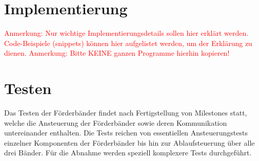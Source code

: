 \documentclass[a4paper, 11pt]{article}
\begin{document}
\newpage

\label{sec:hsm3}

\newpage
\section{Implementierung}
\textcolor{red}{Anmerkung: Nur wichtige Implementierungsdetails sollen hier erklärt werden. Code-Beispiele (snippets) können hier aufgelistet werden, um der Erklärung zu dienen. 
Anmerkung: Bitte KEINE ganzen Programme hierhin kopieren!
}

\section{Testen}
Das Testen der Förderbänder findet nach Fertigstellung von Milestones statt, welche die Ansteuerung der Förderbänder sowie deren Kommunikation untereinander enthalten. Die Tests reichen von essentiellen Ansteuerungstests einzelner Komponenten der Förderbänder bis hin zur Ablaufsteuerung über alle drei Bänder. Für die Abnahme werden speziell komplexere Tests durchgeführt.
\end{document}
